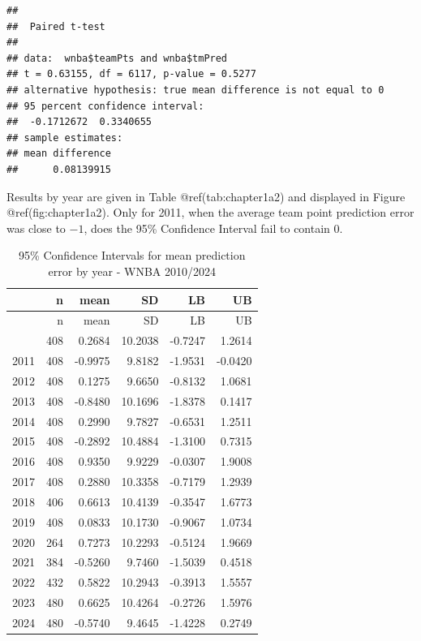\documentclass[
]{book}
\begin{document}
\begin{verbatim}
## 
##  Paired t-test
## 
## data:  wnba$teamPts and wnba$tmPred
## t = 0.63155, df = 6117, p-value = 0.5277
## alternative hypothesis: true mean difference is not equal to 0
## 95 percent confidence interval:
##  -0.1712672  0.3340655
## sample estimates:
## mean difference 
##      0.08139915
\end{verbatim}

Results by year are given in Table @ref(tab:chapter1a2) and displayed in
Figure @ref(fig:chapter1a2). Only for 2011, when the average team point
prediction error was close to \(-1\), does the 95\% Confidence Interval
fail to contain 0.

\begin{longtable}[]{@{}lrrrrr@{}}
\caption{95\% Confidence Intervals for mean prediction error by year -
WNBA 2010/2024}\tabularnewline
\toprule\noalign{}
& n & mean & SD & LB & UB \\
\midrule\noalign{}
\endfirsthead
\toprule\noalign{}
& n & mean & SD & LB & UB \\
\midrule\noalign{}
\endhead
\bottomrule\noalign{}
\endlastfoot
2010 & 408 & 0.2684 & 10.2038 & -0.7247 & 1.2614 \\
2011 & 408 & -0.9975 & 9.8182 & -1.9531 & -0.0420 \\
2012 & 408 & 0.1275 & 9.6650 & -0.8132 & 1.0681 \\
2013 & 408 & -0.8480 & 10.1696 & -1.8378 & 0.1417 \\
2014 & 408 & 0.2990 & 9.7827 & -0.6531 & 1.2511 \\
2015 & 408 & -0.2892 & 10.4884 & -1.3100 & 0.7315 \\
2016 & 408 & 0.9350 & 9.9229 & -0.0307 & 1.9008 \\
2017 & 408 & 0.2880 & 10.3358 & -0.7179 & 1.2939 \\
2018 & 406 & 0.6613 & 10.4139 & -0.3547 & 1.6773 \\
2019 & 408 & 0.0833 & 10.1730 & -0.9067 & 1.0734 \\
2020 & 264 & 0.7273 & 10.2293 & -0.5124 & 1.9669 \\
2021 & 384 & -0.5260 & 9.7460 & -1.5039 & 0.4518 \\
2022 & 432 & 0.5822 & 10.2943 & -0.3913 & 1.5557 \\
2023 & 480 & 0.6625 & 10.4264 & -0.2726 & 1.5976 \\
2024 & 480 & -0.5740 & 9.4645 & -1.4228 & 0.2749 \\
\end{longtable}
\end{document}

